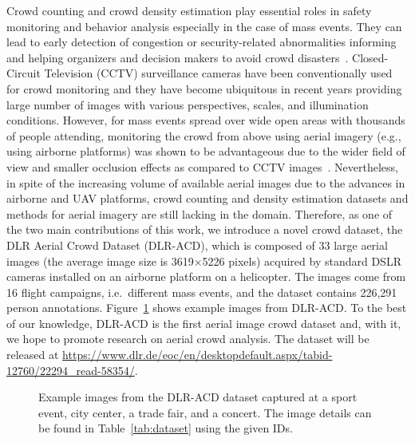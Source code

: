 \documentclass{bmvc2k}
\begin{document}
Crowd counting and crowd density estimation play essential roles in safety monitoring and behavior analysis especially in the case of mass events. They can lead to early detection of congestion or security-related abnormalities informing and helping organizers and decision makers to avoid crowd disasters~\cite{Idrees2018}.
Closed-Circuit Television (CCTV) surveillance cameras have been conventionally used for crowd monitoring and they have become ubiquitous in recent years providing large number of images with various perspectives, scales, and illumination conditions.
However, for mass events spread over wide open areas with thousands of people attending, monitoring the crowd from above using aerial imagery (e.g., using airborne platforms) was shown to be advantageous due to the wider field of view and smaller occlusion effects as compared to CCTV images~\cite{Cui2017}.
Nevertheless, in spite of the increasing volume of available aerial images due to the advances in airborne and UAV platforms, crowd counting and density estimation datasets and methods for aerial imagery are still lacking in the domain.
Therefore, as one of the two main contributions of this work, we introduce a novel crowd dataset, the DLR Aerial Crowd Dataset (DLR-ACD), which is composed of 33 large aerial images (the average image size is 3619$\times$5226 pixels) acquired by standard DSLR cameras installed on an airborne platform on a helicopter. The images come from 16 flight campaigns, i.e.\ different mass events, and the dataset contains 226,291 person annotations. Figure~\ref{fig:sampleData} shows example images from DLR-ACD. To the best of our knowledge, DLR-ACD is the first aerial image crowd dataset and, with it, we hope to promote research on aerial crowd analysis. The dataset will be released at
{\small{\url{https://www.dlr.de/eoc/en/desktopdefault.aspx/tabid-12760/22294\_read-58354/}}}.
\begin{figure}
    \centering
    \caption{Example images from the DLR-ACD dataset captured at a sport event, city center, a trade fair, and a concert. The image details can be found in Table~\ref{tab:dataset} using the given IDs.} 
    \label{fig:sampleData}
\end{figure}
\end{document}
